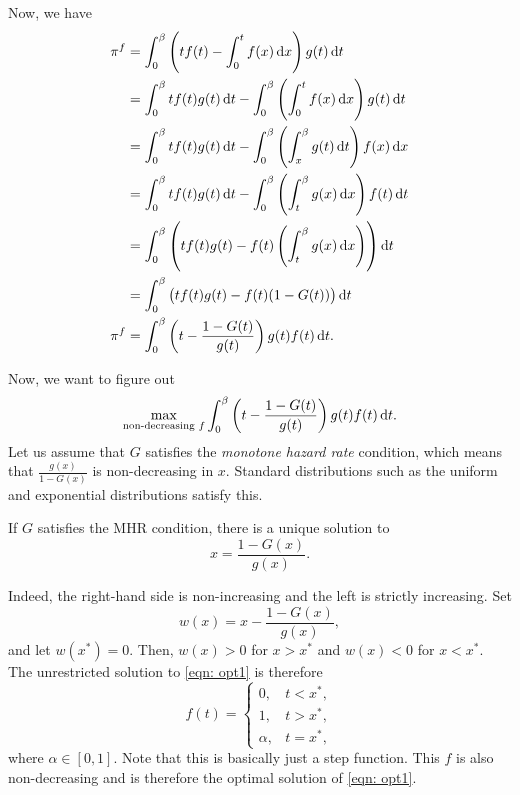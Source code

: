 		Now, we have
		\begin{align*}
			\pi^f &= \int_0^\beta \left( tf(t) - \int_0^t f(x) \dif x \right) g(t) \dif t \\
				&= \int_0^\beta tf(t)g(t) \dif t - \int_0^\beta \left(\int_0^t f(x) \dif x\right) g(t) \dif t \\
				&= \int_0^\beta tf(t)g(t) \dif t - \int_0^\beta \left(\int_x^\beta g(t) \dif t\right) f(x) \dif x \\
				&= \int_0^\beta tf(t)g(t) \dif t - \int_0^\beta \left(\int_t^\beta g(x) \dif x\right) f(t) \dif t \\
				&= \int_0^\beta \left(tf(t)g(t) - f(t)\left(\int_t^\beta g(x) \dif x\right)\right) \dif t \\
				&= \int_0^\beta \left(tf(t)g(t) - f(t)(1-G(t))\right) \dif t \\
			\pi^f &= \int_0^\beta \left( t - \frac{1-G(t)}{g(t)} \right) g(t)f(t) \dif t.
		\end{align*}
		
		Now, we want to figure out
		\begin{equation}
			\label{eqn: opt1}
			\max_{\text{non-decreasing $f$}} \int_0^\beta \left( t - \frac{1-G(t)}{g(t)} \right)g(t)f(t) \dif t.
		\end{equation}
		Let us assume that $G$ satisfies the \emph{monotone hazard rate} condition, which means that $\frac{g(x)}{1-G(x)}$ is non-decreasing in $x$. Standard distributions such as the uniform and exponential distributions satisfy this.

		\begin{fact}
			If $G$ satisfies the MHR condition, there is a unique solution to
			\[ x = \frac{1-G(x)}{g(x)}. \]
		\end{fact}
		Indeed, the right-hand side is non-increasing and the left is strictly increasing. Set
		\[ w(x) = x - \frac{1-G(x)}{g(x)}, \]
		and let $w(x^*) = 0$. Then, $w(x) > 0$ for $x > x^*$ and $w(x) < 0$ for $x < x^*$. The unrestricted solution to \cref{eqn: opt1} is therefore
		\begin{equation}
			\label{eqn: optimal dist single agent}
			f(t) =
			\begin{cases}
				0, & t < x^*, \\
				1, & t > x^*, \\
				\alpha, & t = x^*,
			\end{cases}
		\end{equation}
		where $\alpha \in [0,1]$. Note that this is basically just a step function. This $f$ is also non-decreasing and is therefore the optimal solution of \cref{eqn: opt1}.

